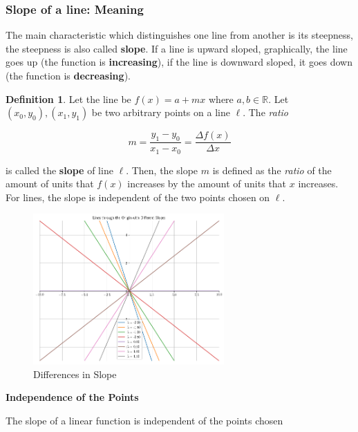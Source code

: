 \documentclass[a4paper,11pt]{article}
\theoremstyle{definition}
\newtheorem{definition}{Definition}
\theoremstyle{plain}
\begin{document}
\subsubsection{Slope of a line: Meaning}\label{slope-of-a-line-meaning}

The main characteristic which distinguishes one line from another is its
steepness, the steepness is also called \textbf{slope}. If a line is
upward sloped, graphically, the line goes up (the function is
\textbf{increasing}), if the line is downward sloped, it goes down (the
function is \textbf{decreasing}).

\begin{definition} 
Let the line be \(f(x) = a + m x\) where
\(a,b\in\mathbb{R}\). Let \((x_0,y_0),(x_1,y_1)\) be two arbitrary
points on a line \(\ell\). The \emph{ratio}

\[
m = \frac{y_1-y_0}{x_1-x_0} = \frac{\Delta f(x)}{\Delta x}
\]

is called the \textbf{slope} of line \(\ell\). Then, the slope \(m\) is
defined as the \emph{ratio} of the amount of units that \(f(x)\)
increases by the amount of units that \(x\) increases. For lines, the
slope is independent of the two points chosen on \(\ell\).
\end{definition}

    \begin{figure}[htbp]
    	\centering 
    		\includegraphics[width = 0.65\textwidth]{Ch1_files/Ch1_4_0.png}
    		\caption{Differences in Slope}
    		\label{fig:slopes_origin}
    \end{figure}
    

\textbf{Independence of the Points}

The slope of a linear function is independent of the points chosen
\end{document}
